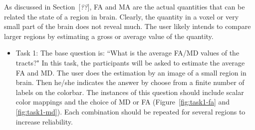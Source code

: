 \documentclass[hyperref, plainreport, noproblem]{cgvpub1}
\newcommand{\comment}[1]{{\color{red}[\textit{#1}]}}
\begin{document}
As discussed in Section~\comment{??}, FA and MA are the actual quantities that can be related the state of a region in brain. Clearly, the quantity in a voxel or very small part of the brain does not reveal much. The user likely intends to compare larger regions by estimating a gross or average value of the quantity.
\begin{itemize}
	\item{Task 1:} The base question is: ``What is the average FA/MD values of the tracts?"
	In this task, the participants will be asked to estimate the average FA and MD. The user does the estimation by an image of a small region in brain. Then he/she indicates the answer by choose from a finite number of labels on the colorbar. The instances of this question should include scalar color mappings and the choice of MD or FA (Figure~\ref{fig:task1-fa} and \ref{fig:task1-md}). Each combination should be repeated for several regions to increase reliability. 


\end{itemize}
\end{document}
